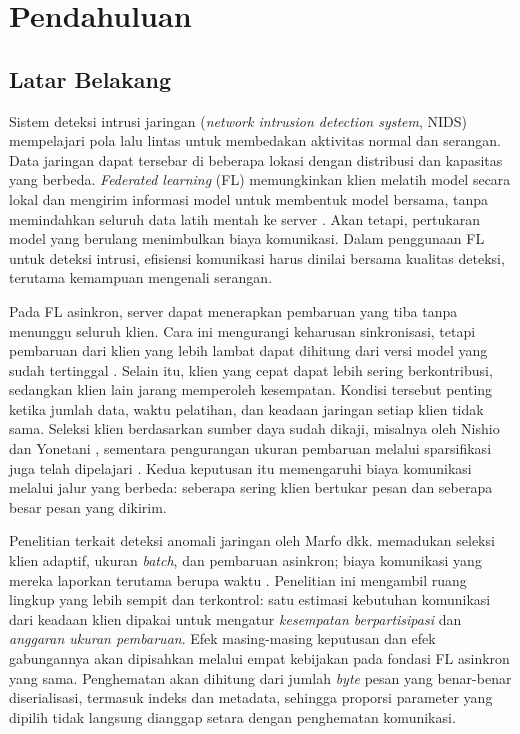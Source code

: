 \chapter{Pendahuluan}
\label{bab:pendahuluan}

\section{Latar Belakang}
Sistem deteksi intrusi jaringan (\textit{network intrusion detection system}, NIDS) mempelajari pola lalu lintas untuk membedakan aktivitas normal dan serangan. Data jaringan dapat tersebar di beberapa lokasi dengan distribusi dan kapasitas yang berbeda. \textit{Federated learning} (FL) memungkinkan klien melatih model secara lokal dan mengirim informasi model untuk membentuk model bersama, tanpa memindahkan seluruh data latih mentah ke server \cite{mcmahan2017,agrawal2021}. Akan tetapi, pertukaran model yang berulang menimbulkan biaya komunikasi. Dalam penggunaan FL untuk deteksi intrusi, efisiensi komunikasi harus dinilai bersama kualitas deteksi, terutama kemampuan mengenali serangan.

Pada FL asinkron, server dapat menerapkan pembaruan yang tiba tanpa menunggu seluruh klien. Cara ini mengurangi keharusan sinkronisasi, tetapi pembaruan dari klien yang lebih lambat dapat dihitung dari versi model yang sudah tertinggal \cite{xie2019}. Selain itu, klien yang cepat dapat lebih sering berkontribusi, sedangkan klien lain jarang memperoleh kesempatan. Kondisi tersebut penting ketika jumlah data, waktu pelatihan, dan keadaan jaringan setiap klien tidak sama. Seleksi klien berdasarkan sumber daya sudah dikaji, misalnya oleh Nishio dan Yonetani \cite{nishio2019}, sementara pengurangan ukuran pembaruan melalui sparsifikasi juga telah dipelajari \cite{lin2018}. Kedua keputusan itu memengaruhi biaya komunikasi melalui jalur yang berbeda: seberapa sering klien bertukar pesan dan seberapa besar pesan yang dikirim.

Penelitian terkait deteksi anomali jaringan oleh Marfo dkk. memadukan seleksi klien adaptif, ukuran \textit{batch}, dan pembaruan asinkron; biaya komunikasi yang mereka laporkan terutama berupa waktu \cite{marfo2025}. Penelitian ini mengambil ruang lingkup yang lebih sempit dan terkontrol: satu estimasi kebutuhan komunikasi dari keadaan klien dipakai untuk mengatur \emph{kesempatan berpartisipasi} dan \emph{anggaran ukuran pembaruan}. Efek masing-masing keputusan dan efek gabungannya akan dipisahkan melalui empat kebijakan pada fondasi FL asinkron yang sama. Penghematan akan dihitung dari jumlah \textit{byte} pesan yang benar-benar diserialisasi, termasuk indeks dan metadata, sehingga proporsi parameter yang dipilih tidak langsung dianggap setara dengan penghematan komunikasi.

